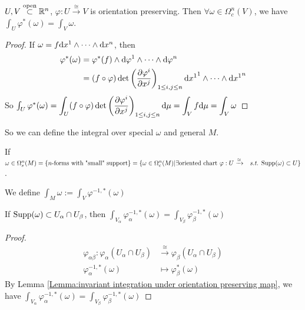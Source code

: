 \begin{lemma}\label{Lemma:invariant integration under orientation preserving map}
    $ U,V\overset{\text{open}}{\subset}\mathbb R^n $, $ \varphi:U\xrightarrow{\cong}V $ is orientation preserving. Then  $ \forall \omega\in \Omega_c^n(V) $, we have  $ \int_U\varphi^*(\omega)=\int_V\omega $.    
\end{lemma}
\begin{proof}
   If $ \omega=f\mathrm{d} {x}^1\wedge\cdots\wedge\mathrm{d} {x}^n $, then 
   \begin{equation}
       \begin{aligned}
           \varphi^*(\omega)&=\varphi^*(f)\wedge\mathrm{d} {\varphi}^1\wedge\cdots\wedge\mathrm{d} {\varphi}^n\\
           &=(f\circ\varphi)\det\left(\frac{\partial \varphi^i}{\partial x^j}\right)_{1 \leq i,j \leq n}\mathrm{d} {x^1}^1\wedge\cdots\wedge\mathrm{d} {x^1}^n
       \end{aligned}
   \end{equation}
   So  $ \int_U\varphi^*(\omega)=\displaystyle\int_U (f\circ\varphi)\det\left(\frac{\partial \varphi^i}{\partial x^j}\right)_{1 \leq i,j \leq n}\mathrm{d} \mu=\int_Vf\mathrm{d} \mu=\int_V\omega$ 
     
\end{proof}
So we can define the integral over special  $ \omega $ and  general  $ M $.
\begin{definition}
   If  $ \omega\in\name{$ \Omega_s^n(M) $}=\{\text{$ n $-forms with "small" support}\}\\= \{\omega\in\Omega_c^n(M)|\exists\text{oriented chart  $ \varphi:U\xrightarrow{ \cong} $ \st }\Supp(\omega)\subset U\} $.
   
   We define  $ \int_M\omega:=\int_V\varphi^{-1,*}(\omega) $ 
\end{definition} 
\begin{claim}
   If  $ \mathrm{Supp}(\omega)\subset U_\alpha\cap U_\beta $, then  $ \int_{V_\alpha}\varphi_\alpha^{-1,*}(\omega)=\int_{V_\beta}\varphi_\beta^{-1,*}(\omega) $  
\end{claim}
\begin{proof}
   \begin{align*}
       \varphi_{\alpha\beta}:\varphi_\alpha(U_\alpha\cap U_\beta)&\xrightarrow{\cong}\varphi_\beta(U_\alpha\cap U_\beta)\\
       \varphi_\alpha^{-1,*}(\omega)&\mapsto \varphi_\beta^*(\omega)
   \end{align*}
   By Lemma \ref{Lemma:invariant integration under orientation preserving map}, we have  $ \int_{V_\alpha}\varphi_\alpha^{-1,*}(\omega)=\int_{V_\beta}\varphi_\beta^{-1,*}(\omega) $ 
\end{proof}
